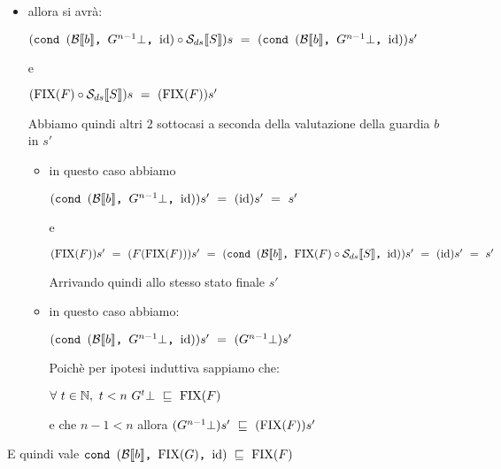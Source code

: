 {\begin{itemize}
    \item {} allora si avrà:
    \begin{center}
    $(\cond{b}{G^{n-1}\bot}{\idDS} \circ \Sds)s~=~
    (\cond{b}{G^{n-1}\bot}{\idDS})s'$
    \end{center}
    e
    \begin{center}
    $(\fixp{F} \circ{} \Sds{})s~=~(\fixp{F})s'$
    \end{center}
    Abbiamo quindi altri 2 sottocasi a seconda della valutazione della guardia 
    $b$ in $s'$
        \begin{itemize}
        \item {} in questo caso abbiamo 
        \begin{center}
        $(\cond{b}{G^{n-1}\bot}{\idDS})s'~=~(\idDS)s'~=~s'$
        \end{center}
        e
        \begin{center}
        $(\fixp{F})s'~=~(F(\fixp{F}))s'~=~
        (\cond{b}{\fixp{F} \circ{} \Sds{}}{\idDS})s'~=~(\idDS)s'~=~s'$
        \end{center}
        Arrivando quindi allo stesso stato finale $s'$

        \item {} in questo caso abbiamo:
        \begin{center}
        $(\cond{b}{G^{n-1}\bot}{\idDS})s'~=~(G^{n-1}\bot)s'$
        \end{center}
        Poichè per ipotesi induttiva sappiamo che:
        \begin{center}
        $\forall~t\in\mathbb{N},~t<n~G^{t}\bot~\mineq~\fixp{F}$
        \end{center}
        e che $n-1<n$ allora $(G^{n-1}\bot)s'~\mineq~(\fixp{F})s'$
        \end{itemize}
    \end{itemize}
    E quindi vale $\cond{b}{\fixp{G}}{\idDS}~\mineq~\fixp{F}$
}
\newpage